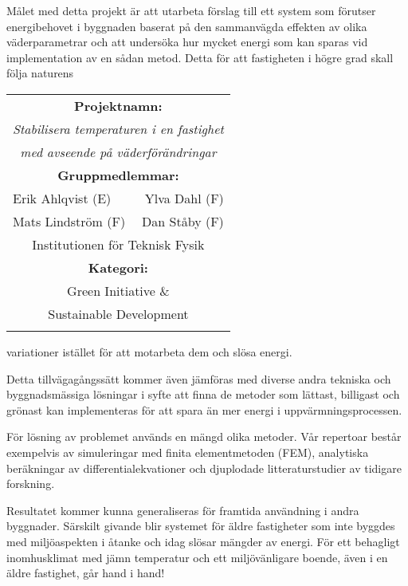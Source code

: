 \documentclass[11pt,a4paper]{article}
\begin{document}
\begin{multicols}{2}
Målet med detta projekt är att utarbeta förslag till ett system som förutser energibehovet i byggnaden baserat på den sammanvägda effekten av olika väderparametrar och att undersöka hur mycket energi som kan sparas vid implementation av en sådan metod. Detta för att fastigheten i högre grad skall följa naturens 
\renewcommand{\arraystretch}{1.2}
\noindent
\resizebox{8cm}{!} {
\begin{tabular}{l r}
\hline
\multicolumn{2}{|c|}{\cellcolor{YellowGreen} \textbf{Projektnamn:}}\\[3pt]
\multicolumn{2}{|c|}{\cellcolor{YellowGreen} \textit{Stabilisera temperaturen i en fastighet}}\\
\multicolumn{2}{|c|}{\cellcolor{YellowGreen} \textit{med avseende på väderförändringar}} \\
\multicolumn{2}{|c|}{\cellcolor{YellowGreen} \textbf{Gruppmedlemmar:}} \\[3pt]
\multicolumn{1}{|l}{\cellcolor{YellowGreen} Erik Ahlqvist (E)} & \multicolumn{1}{r|}{\cellcolor{YellowGreen} Ylva Dahl (F)}\\
\multicolumn{1}{|l}{\cellcolor{YellowGreen} Mats Lindström (F)} & \multicolumn{1}{r|}{\cellcolor{YellowGreen} Dan Ståby (F)}\\
\multicolumn{2}{|c|}{\cellcolor{YellowGreen} Institutionen för Teknisk Fysik} \\
\multicolumn{2}{|c|}{\cellcolor{YellowGreen} \textbf{Kategori:}} \\[3pt]
\multicolumn{2}{|c|}{\cellcolor{YellowGreen} Green Initiative \&}\\
\multicolumn{2}{|c|}{\cellcolor{YellowGreen} Sustainable Development}\\
\hline
& \\
\end{tabular}
}
variationer istället för att motarbeta dem och slösa energi.

Detta tillvägagångssätt kommer även jämföras med diverse andra tekniska och byggnadsmässiga lösningar i syfte att finna de metoder som lättast, billigast och grönast kan implementeras för att spara än mer energi i uppvärmningsprocessen.

För lösning av problemet används en mängd olika metoder. Vår repertoar består exempelvis av simuleringar med finita elementmetoden (FEM), analytiska beräkningar av differentialekvationer och djuplodade litteraturstudier av tidigare forskning.

Resultatet kommer kunna generaliseras för framtida användning i andra byggnader. Särskilt givande blir systemet för äldre fastigheter som inte byggdes med miljöaspekten i åtanke och idag slösar mängder av energi. För ett behagligt inomhusklimat med jämn temperatur och ett miljövänligare boende, även i en äldre fastighet, går hand i hand!

\end{multicols}
\end{document}
